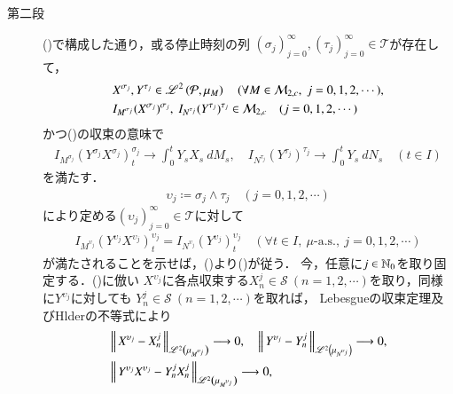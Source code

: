 \begin{prf}
\begin{description}
			\item[第二段]
				()で構成した通り，或る停止時刻の列
				$(\sigma_j)_{j=0}^{\infty},(\tau_j)_{j=0}^{\infty} \in \mathcal{T}$が存在して，
				\begin{align}
					&X^{\sigma_j},Y^{\tau_j} \in \semiLp{2}{\mathcal{P},\mu_{M}}
					\quad (\forall M \in \mathcal{M}_{2,c},\ j=0,1,2,\cdots), \\
					&I_{M^{\sigma_j}}(X^{\sigma_j})^{\sigma_j},\ I_{N^{\tau_j}}(Y^{\tau_j})^{\tau_j} \in \mathcal{M}_{2,c}
					\quad (j=0,1,2,\cdots)
				\end{align}
				かつ()の収束の意味で
				\begin{align}
					I_{M^{\sigma_j}}(Y^{\sigma_j}X^{\sigma_j})^{\sigma_j}_t \longrightarrow \int_0^t Y_s X_s\ dM_s,
					\quad I_{N^{\tau_j}}(Y^{\tau_j})^{\tau_j} \longrightarrow \int_0^t Y_s\ dN_s
					\quad (t \in I)
					\label{eq:Ito-Integral_on_M_c_loc_report_7_1}
				\end{align}
				を満たす．
				\begin{align}
					\upsilon_j \coloneqq \sigma_j \wedge \tau_j 
					\quad (j=0,1,2,\cdots)
				\end{align}
				により定める$(\upsilon_j)_{j=0}^{\infty} \in \mathcal{T}$に対して
				\begin{align}
					I_{M^{\upsilon_j}} (Y^{\upsilon_j}X^{\upsilon_j})^{\upsilon_j}_t
					= I_{N^{\upsilon_j}} (Y^{\upsilon_j})^{\upsilon_j}_t
					\quad (\forall t \in I,\ \mbox{$\mu$-a.s.},\ j=0,1,2,\cdots)
					\label{eq:Ito-Integral_on_M_c_loc_report_7_2}
				\end{align}
				が満たされることを示せば，()より()が従う．
				今，任意に$j \in \mathbb{N}_0$を取り固定する．()に倣い
				$X^{\upsilon_j}$に各点収束する$X^j_n \in \mathcal{S}\ (n=1,2,\cdots)$を取り，同様に$Y^{\upsilon_j}$に対しても
				$Y^j_n \in \mathcal{S}\ (n=1,2,\cdots)$を取れば，
				Lebesgueの収束定理及びHlderの不等式により
				\begin{align}
					&\left\|\, X^{\upsilon_j} - X^j_n\, \right\|_{\mathscr{L}^{2} \left(\mu_{M^{\upsilon_j}}\right)} \longrightarrow 0, 
					\quad \left\|\, Y^{\upsilon_j} - Y^j_n\, \right\|_{\mathscr{L}^{2} \left(\mu_{N^{\upsilon_j}}\right)} \longrightarrow 0, \\
					&\left\|\, Y^{\upsilon_j}X^{\upsilon_j} - Y^j_n X^j_n\, \right\|_{\mathscr{L}^{2} \left(\mu_{M^{\upsilon_j}}\right)} \longrightarrow 0, 
				\end{align}

\end{description}
\end{prf}
